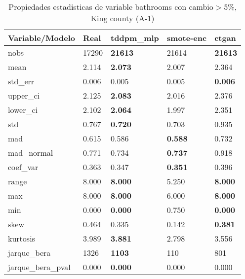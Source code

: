 \begin{table}[H]
\centering
\fontsize{8}{14}\selectfont
\caption{Propiedades estadisticas de variable bathrooms con cambio\ensuremath{>}5\%, King county (A-1)}
\label{table-stats-king county-a-1-bathrooms-short}
\begin{tabular}{|l|m{10em}|m{10em}|m{10em}|m{10em}|}
\hline
 \rowcolor[gray]{0.8}
Variable/Modelo & Real & tddpm\_mlp & smote-enc & ctgan \\
\hline nobs & 17290 & \bfseries 21613 & \cellcolor[rgb]{0.9, 0.54, 0.52} 21614 & \bfseries 21613 \\
\hline mean & 2.114 & \bfseries 2.073 & 2.007 & \cellcolor[rgb]{0.9, 0.54, 0.52} 2.364 \\
\hline std\_err & 0.006 & 0.005 & \cellcolor[rgb]{0.9, 0.54, 0.52} 0.005 & \bfseries 0.006 \\
\hline upper\_ci & 2.125 & \bfseries 2.083 & 2.016 & \cellcolor[rgb]{0.9, 0.54, 0.52} 2.376 \\
\hline lower\_ci & 2.102 & \bfseries 2.064 & 1.997 & \cellcolor[rgb]{0.9, 0.54, 0.52} 2.351 \\
\hline std & 0.767 & \bfseries 0.720 & 0.703 & \cellcolor[rgb]{0.9, 0.54, 0.52} 0.935 \\
\hline mad & 0.615 & 0.586 & \bfseries 0.588 & \cellcolor[rgb]{0.9, 0.54, 0.52} 0.732 \\
\hline mad\_normal & 0.771 & 0.734 & \bfseries 0.737 & \cellcolor[rgb]{0.9, 0.54, 0.52} 0.918 \\
\hline coef\_var & 0.363 & 0.347 & \bfseries 0.351 & \cellcolor[rgb]{0.9, 0.54, 0.52} 0.396 \\
\hline range & 8.000 & \bfseries 8.000 & \cellcolor[rgb]{0.9, 0.54, 0.52} 5.250 & \bfseries 8.000 \\
\hline max & 8.000 & \bfseries 8.000 & \cellcolor[rgb]{0.9, 0.54, 0.52} 6.000 & \bfseries 8.000 \\
\hline min & 0.000 & \bfseries 0.000 & \cellcolor[rgb]{0.9, 0.54, 0.52} 0.750 & \bfseries 0.000 \\
\hline skew & 0.464 & 0.335 & \cellcolor[rgb]{0.9, 0.54, 0.52} 0.142 & \bfseries 0.381 \\
\hline kurtosis & 3.989 & \bfseries 3.881 & \cellcolor[rgb]{0.9, 0.54, 0.52} 2.798 & 3.556 \\
\hline jarque\_bera & 1326 & \bfseries 1103 & \cellcolor[rgb]{0.9, 0.54, 0.52} 110 & 801 \\
\hline jarque\_bera\_pval & 0.000 & \bfseries 0.000 & \cellcolor[rgb]{0.9, 0.54, 0.52} 0.000 & 0.000 \\

\end{tabular}
\end{table}
